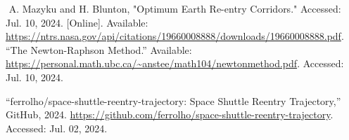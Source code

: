 \documentclass[runningheads]{llncs}
\begin{document}
\begin{thebibliography}{10}
‌
A. Mazyku and H. Blunton, "Optimum Earth Re-entry Corridors." Accessed: Jul. 10, 2024. [Online]. Available: \url{https://ntrs.nasa.gov/api/citations/19660008888/downloads/19660008888.pdf}.
‌
“The Newton-Raphson Method.” Available: \url{https://personal.math.ubc.ca/~anstee/math104/newtonmethod.pdf}. Accessed: Jul. 10, 2024.


“ferrolho/space-shuttle-reentry-trajectory: Space Shuttle Reentry Trajectory,” GitHub, 2024. \url{https://github.com/ferrolho/space-shuttle-reentry-trajectory}. Accessed: Jul. 02, 2024.


\end{thebibliography}
\end{document}
